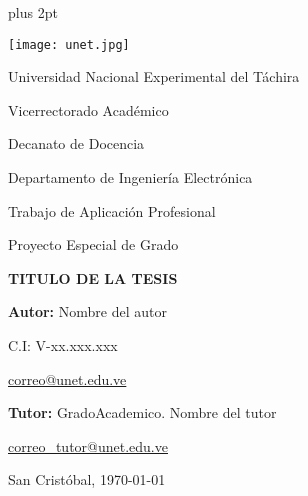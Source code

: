 \begin{titlepage}
	\parskip=7.25pt plus 2pt
	\begin{center}
		\texttt{[image: unet.jpg]}
		
		Universidad Nacional Experimental del Táchira 
		
		Vicerrectorado Académico
		
		Decanato de Docencia
		
		Departamento de Ingeniería Electrónica
		
		Trabajo de Aplicación Profesional
		
		Proyecto Especial de Grado
	\end{center}

	\centering
		\vspace{2.5cm}
		\vfill
		{\Large \textbf{TITULO DE LA TESIS}\par}

	\vfill
	\begin{flushright}
		\begin{spacing}{1.5}
			\textbf{Autor:} Nombre del autor
			
			C.I: V-xx.xxx.xxx
			
			\href{correo@unet.edu.ve}{correo@unet.edu.ve}
			
			\textbf{Tutor:} GradoAcademico. Nombre del tutor
			
			\href{correo\_tutor@unet.edu.ve}{correo\_tutor@unet.edu.ve}
		\end{spacing}	
	\end{flushright}

	\vfill
		San Cristóbal, \monthyeardate\today
	\leavevmode
\end{titlepage}